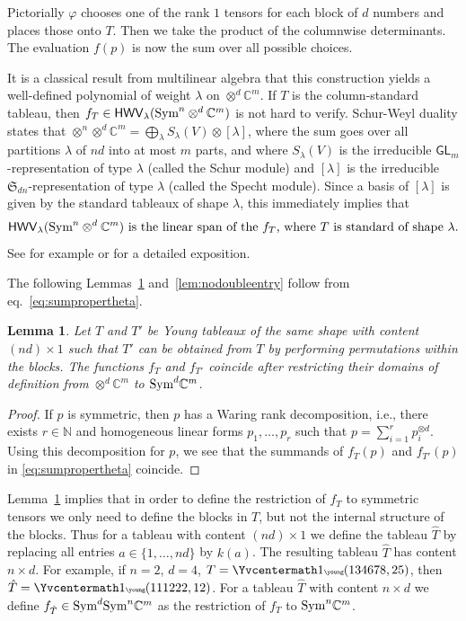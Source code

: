 \documentclass[10pt,a4paper]{article}
\numberwithin{equation}{section}
\newtheorem{lemma}[equation]{Lemma}
\theoremstyle{definition}
\newcommand{\Sym}{\textup{Sym}}
\newcommand{\GL}{\mathsf{GL}}
\newcommand{\HWV}{\mathsf{HWV}}
\newcommand{\IC}{\mathbb{C}}
\newcommand{\IN}{\mathbb{N}}
\newcommand{\aS}{\mathfrak{S}}
\newcommand{\la}{\lambda}
\begin{document}
Pictorially $\varphi$ chooses one of the rank $1$ tensors for each block of $d$ numbers and places those onto $T$.
Then we take the product of the columnwise determinants.
The evaluation $f(p)$ is now the sum over all possible choices.

It is a classical result from multilinear algebra that this construction yields a well-defined polynomial of weight $\la$ on $\otimes^d \IC^m$.
If $T$ is the column-standard tableau, then $f_T \in \HWV_\la(\Sym^n\otimes^d \IC^m)$ is not hard to verify.
Schur-Weyl duality states that
$\otimes^n \otimes^d \IC^m = \bigoplus_{\la} S_\la(V) \otimes [\la]$,
where the sum goes over all partitions $\la$ of $nd$ into at most $m$ parts,
and where $S_\la(V)$ is the irreducible $\GL_m$-representation of type $\la$ (called the Schur module) and $[\la]$ is the irreducible $\aS_{dn}$-representation of type $\la$ (called the Specht module).
Since a basis of $[\la]$ is given by the standard tableaux of shape $\la$,
this immediately implies that
\begin{equation}\label{eq:span}
\text{$\HWV_\la(\Sym^n\otimes^d \IC^m)$ is the linear span of the $f_T$, where $T$ is standard of shape $\la$.}
\end{equation} See for example \cite{Ott:13} or \cite[Ch.~19]{BI:17} for a detailed exposition.

The following Lemmas~\ref{lem:orderedentries} and~\ref{lem:nodoubleentry} follow from eq.~\eqref{eq:sumpropertheta}.

\begin{lemma}\label{lem:orderedentries}
Let $T$ and $T'$ be Young tableaux of the same shape with content $(nd)\times 1$ such that $T'$ can be obtained from $T$ by performing permutations within the blocks.
The functions $f_T$ and $f_{T'}$ coincide after restricting their domains of definition from $\otimes^d\IC^m$ to $\Sym^d\IC^m$.
\end{lemma}
\begin{proof}
If $p$ is symmetric, then $p$ has a Waring rank decomposition, i.e., there exists $r\in\IN$ and homogeneous linear forms $p_1,\ldots,p_r$ such that $p=\sum_{i=1}^r p_i^{\otimes d}$.
Using this decomposition for $p$, we see that the summands of $f_T(p)$ and $f_{T'}(p)$ in \eqref{eq:sumpropertheta} coincide.
\end{proof}

Lemma~\ref{lem:orderedentries} implies that in order to define the restriction of $f_T$ to symmetric tensors we only need to define the blocks in $T$, but not the internal structure of the blocks.
Thus for a tableau with content $(nd)\times 1$ we define the tableau $\hat T$ by replacing all entries $a \in\{1,\ldots,nd\}$ by $k(a)$.
The resulting tableau $\hat T$ has content $n \times d$.
For example, if $n=2$, $d=4$,  $T={\Yvcentermath1\tiny\young(134678,25)}$, then $\hat T = {\Yvcentermath1\tiny\young(111222,12)}$.
For a tableau $\hat T$ with content $n \times d$ we define $f_{\hat T} \in \Sym^d \Sym^n \IC^m$ as the restriction of $f_T$ to $\Sym^n\IC^m$.
\end{document}
